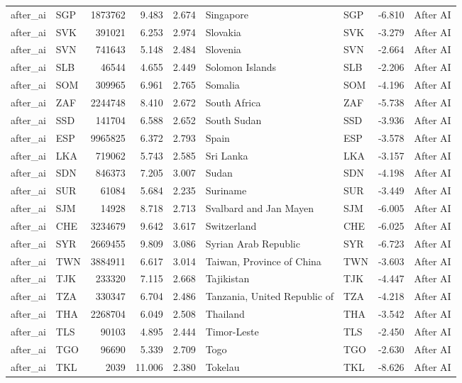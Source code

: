 \begin{tabular}{llrrrllrl}
after\_ai & SGP & 1873762 & 9.483 & 2.674 & Singapore & SGP & -6.810 & After AI \\
after\_ai & SVK & 391021 & 6.253 & 2.974 & Slovakia & SVK & -3.279 & After AI \\
after\_ai & SVN & 741643 & 5.148 & 2.484 & Slovenia & SVN & -2.664 & After AI \\
after\_ai & SLB & 46544 & 4.655 & 2.449 & Solomon Islands & SLB & -2.206 & After AI \\
after\_ai & SOM & 309965 & 6.961 & 2.765 & Somalia & SOM & -4.196 & After AI \\
after\_ai & ZAF & 2244748 & 8.410 & 2.672 & South Africa & ZAF & -5.738 & After AI \\
after\_ai & SSD & 141704 & 6.588 & 2.652 & South Sudan & SSD & -3.936 & After AI \\
after\_ai & ESP & 9965825 & 6.372 & 2.793 & Spain & ESP & -3.578 & After AI \\
after\_ai & LKA & 719062 & 5.743 & 2.585 & Sri Lanka & LKA & -3.157 & After AI \\
after\_ai & SDN & 846373 & 7.205 & 3.007 & Sudan & SDN & -4.198 & After AI \\
after\_ai & SUR & 61084 & 5.684 & 2.235 & Suriname & SUR & -3.449 & After AI \\
after\_ai & SJM & 14928 & 8.718 & 2.713 & Svalbard and Jan Mayen & SJM & -6.005 & After AI \\
after\_ai & CHE & 3234679 & 9.642 & 3.617 & Switzerland & CHE & -6.025 & After AI \\
after\_ai & SYR & 2669455 & 9.809 & 3.086 & Syrian Arab Republic & SYR & -6.723 & After AI \\
after\_ai & TWN & 3884911 & 6.617 & 3.014 & Taiwan, Province of China & TWN & -3.603 & After AI \\
after\_ai & TJK & 233320 & 7.115 & 2.668 & Tajikistan & TJK & -4.447 & After AI \\
after\_ai & TZA & 330347 & 6.704 & 2.486 & Tanzania, United Republic of & TZA & -4.218 & After AI \\
after\_ai & THA & 2268704 & 6.049 & 2.508 & Thailand & THA & -3.542 & After AI \\
after\_ai & TLS & 90103 & 4.895 & 2.444 & Timor-Leste & TLS & -2.450 & After AI \\
after\_ai & TGO & 96690 & 5.339 & 2.709 & Togo & TGO & -2.630 & After AI \\
after\_ai & TKL & 2039 & 11.006 & 2.380 & Tokelau & TKL & -8.626 & After AI \\

\end{tabular}

